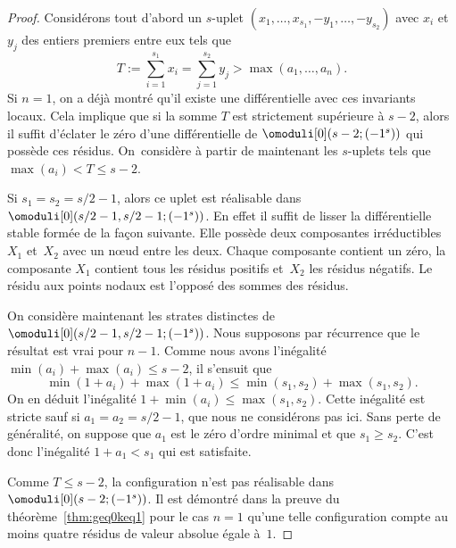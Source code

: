 \begin{proof}
Considérons tout d'abord un $s$-uplet $(x_{1},\dots,x_{s_{1}},-y_{1},\dots,-y_{s_{2}})$ avec $x_{i}$ et $y_{j}$ des entiers premiers entre eux tels que\vspace*{-3pt}\enlargethispage{.5\baselineskip}%
\[
T:=\sum_{i=1}^{s_{1}} x_{i} = \sum_{j=1}^{s_{2}} y_{j} > \max(a_{1},\dots,a_{n}).
\]
Si $n=1$, on a déjà montré qu'il existe une différentielle avec ces invariants locaux. Cela implique que si la somme $T$ est strictement supérieure à $s-2$, alors il suffit d'éclater le zéro d'une différentielle de $\omoduli[0](s-2;(-1^{s}))$ qui possède ces résidus. On~considère à partir de maintenant les $s$-uplets tels que $\max(a_{i}) < T \leq s-2$.

Si $s_{1}=s_{2}=s/2-1$, alors ce uplet est réalisable dans $\omoduli[0](s/2-1, s/2-1;(-1^{s}))$. En effet il suffit de lisser la différentielle stable formée de la façon suivante. Elle possède deux composantes irréductibles $X_{1}$ et~$X_{2}$ avec un nœud entre les deux. Chaque composante contient un zéro, la composante $X_{1}$ contient tous les résidus positifs et~$X_{2}$ les résidus négatifs. Le résidu aux points nodaux est l'opposé des sommes des résidus.

On considère maintenant les strates distinctes de $\omoduli[0](s/2-1, s/2-1;(-1^{s}))$. Nous supposons par récurrence que le résultat est vrai pour $n-1$. Comme nous avons l'inégalité $\min(a_{i})+\max(a_{i}) \leq s-2$, il s'ensuit que\vspace*{-3pt}
\[
\min(1+a_{i})+\max(1+a_{i}) \leq \min(s_{1},s_{2})+\max(s_{1},s_{2}).
\]
On en déduit l'inégalité $1 + \min(a_{i}) \leq \max (s_{1},s_{2})$. Cette inégalité est stricte sauf si $a_{1}=a_{2}=s/2-1$, que nous ne considérons pas ici. Sans perte de généralité, on suppose que $a_{1}$ est le zéro d’ordre minimal et que $s_{1}\geq s_{2}$. C'est donc l'inégalité $1 + a_1 < s_{1}$ qui est satisfaite.

Comme $T \leq s-2$, la configuration n'est pas réalisable dans $\omoduli[0](s-2;(-1^{s}))$. Il est démontré dans la preuve du théorème~\ref{thm:geq0keq1} pour le cas $n=1$ qu'une telle configuration compte au moins quatre résidus de valeur absolue égale à~$1$.


\end{proof}
